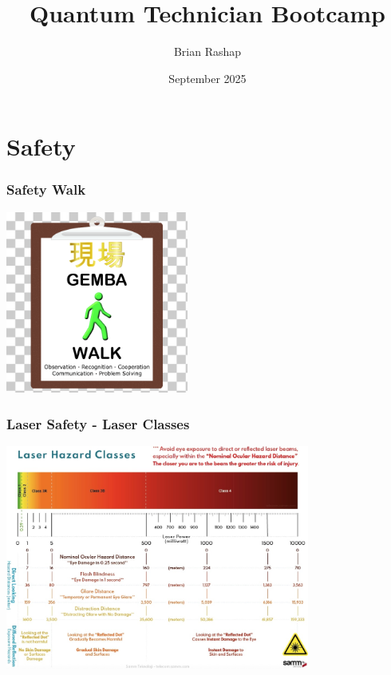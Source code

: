 \documentclass{beamer}
\begin{document}
\title{Quantum Technician Bootcamp}
\author{Brian Rashap}
\date{September 2025} 

\begin{frame}
\titlepage
\end{frame}

\section{Safety}

\begin{frame}\frametitle{Safety Walk}
\begin{center}
\includegraphics[width=6cm]{fig/gemba.png}
\end{center}
\end{frame}

\begin{frame}\frametitle{Laser Safety - Laser Classes}
\begin{center}
\includegraphics[width=10cm]{fig/lasersafe.jpg}
\end{center}
\end{frame}
\end{document}
